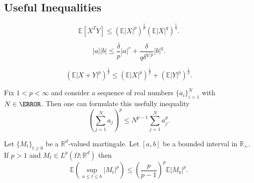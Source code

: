 \documentclass[3p]{elsarticle}
\theoremstyle{definition}
\theoremstyle{plain}%
\newtheorem{thm}{Theorem}[section]
\theoremstyle{remark}
\newcommand{\m}[1]{\mathbb{E}#1}
\begin{document}
	\begin{appendices}
		\section{Useful Inequalities}\begin{Holder}
	\begin{equation}\label{eqn:HolderInequality}
	\m[X^T Y] \leq
	\left(
	\m|X|^p
	\right)^{\frac{1}{p}}		
	\left(
	\m|X|^q
	\right)^{\frac{1}{q}}.
	\end{equation}
\end{Holder}

\begin{Young}
	\begin{equation}\label{eqn:YoungsInequality}
	|a||b| 
	\leq
	\frac{\delta}{p} |a|^r
	+\frac{\delta}{q \delta^{q/p}} |b|^q.
	\end{equation}
\end{Young}
%
\begin{Minkowski}
	\begin{equation}
	\left(
	\m |X+Y|^p
	\right)^{\frac{1}{p}}
	\leq
	\left(
	\m |X|^p
	\right)^{\frac{1}{p}}
	+
	\left(
	\m |Y|^p
	\right)^{\frac{1}{p}}.
	\end{equation}
\end{Minkowski}
%
%
\begin{Standard}
		Fix $1<p<\infty$ and consider a sequence of real numbers $\{a_i\}_{i=1}^{N}$  with $N \in \N$. Then one can 
	formulate this usefully inequality
	\begin{equation}\label{eqn:SingleHolder}
	\left(
	\sum_{j=1}^N a_j
	\right)^p
	\leq
	N^{p-1}
	\sum_{j=1}^{N}
	a_j^p.
	\end{equation}
\end{Standard}
%
\begin{Doobs}
	Let $\{M_t\}_{t\geq 0}$ be a $\mathbb{R}^d$-valued martingale. Let $[a,b]$ be a bounded interval in $
	\mathbb{R}_{+}$.
	If $p>1$ and $M_t\in L^p(\Omega;\mathbb{R}^d)$ then
	\begin{equation}
	\label{eqn:DoobMartingaleInequality}
	\m\left( \sup_{a\leq t \leq b} |M_t|^p\right) 
	\leq \left(\frac{p}{p-1}\right)^p \m|M_b|^p. 
	\end{equation}
\end{Doobs}


\end{appendices}
\end{document}
